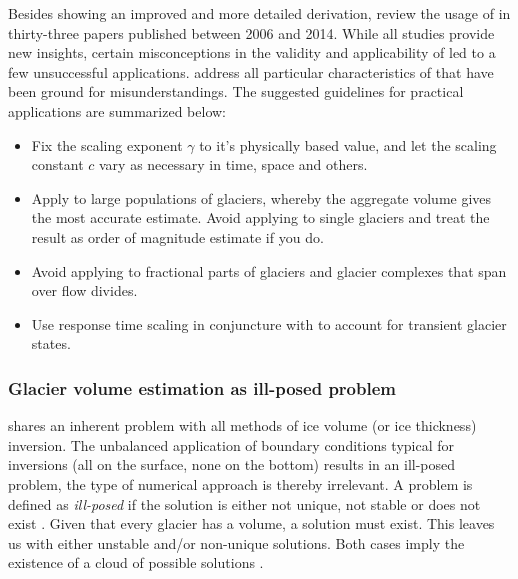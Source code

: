             Besides showing an improved and more detailed derivation, \citet{Bahr2015} review the usage of \vas{} in thirty-three papers published between 2006 and 2014. While all studies provide new insights, certain misconceptions in the validity and applicability of \vas{} led to a few unsuccessful applications. \citet[Section 8]{Bahr2015} address all particular characteristics of \vas{} that have been ground for misunderstandings. The suggested guidelines for practical applications are summarized below:
            \begin{itemize}
                \item Fix the scaling exponent $\gamma$ to it's physically based value, and let the scaling constant $c$ vary as necessary in time, space and others.
                \item Apply \vas{} to large populations of glaciers, whereby the aggregate volume gives the most accurate estimate. Avoid applying \vas{} to single glaciers and treat the result as order of magnitude estimate if you do.
                \item Avoid applying \vas{} to fractional parts of glaciers and glacier complexes that span over flow divides.
                \item Use response time scaling in conjuncture with \vas{} to account for transient glacier states.
            \end{itemize}
            

        \subsubsection{Glacier volume estimation as ill-posed problem} %
        \label{ssub:glacier_volume_estimation_as_ill_posed_problem}

            \Vas{} shares an inherent problem with all methods of ice volume (or ice thickness) inversion. The unbalanced application of boundary conditions typical for inversions (all on the surface, none on the bottom) results in an ill-posed problem, the type of numerical approach is thereby irrelevant. A problem is defined as \emph{ill-posed} if the solution is either not unique, not stable or does not exist \citep{Zhdanov2002}. Given that every glacier has a volume, a solution must exist. This leaves us with either unstable and/or non-unique solutions. Both cases imply the existence of a cloud of possible solutions \citep{Bahr2014}.

